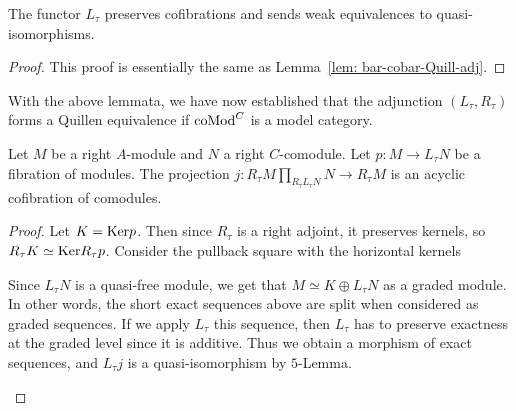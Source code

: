 \documentclass[../thesis.tex]{subfiles}
\begin{document}
            \begin{lemma}
                The functor $L_\tau$ preserves cofibrations and sends weak equivalences to quasi-isomorphisms.
            \end{lemma}

            \begin{proof}
                This proof is essentially the same as Lemma~\ref{lem: bar-cobar-Quill-adj}.
            \end{proof}

            With the above lemmata, we have now established that the adjunction $(L_\tau, R_\tau)$ forms a Quillen equivalence if $\tt{coMod}^C$ is a model category.

            \begin{lemma}
                Let $M$ be a right $A$-module and $N$ a right $C$-comodule. Let $p: M \rightarrow L_\tau N$ be a fibration of modules. The projection $j: R_\tau M \prod_{R_\tau L_\tau N} N \rightarrow R_\tau M$ is an acyclic cofibration of comodules.
            \end{lemma}

            \begin{proof}
                Let $K = \tt{Ker}p$. Then since $R_\tau$ is a right adjoint, it preserves kernels, so $R_\tau K \simeq \tt{Ker}R_\tau p$. Consider the pullback square with the horizontal kernels
                \begin{center}
                \end{center}

                Since $L_\tau N$ is a quasi-free module, we get that $M \simeq K \oplus L_\tau N$ as a graded module. In other words, the short exact sequences above are split when considered as graded sequences. If we apply $L_\tau$ this sequence, then $L_\tau$ has to preserve exactness at the graded level since it is additive. Thus we obtain a morphism of exact sequences, and $L_\tau j$ is a quasi-isomorphism by $5$-Lemma.
                \begin{center}
                \end{center}
            \end{proof}
\end{document}
